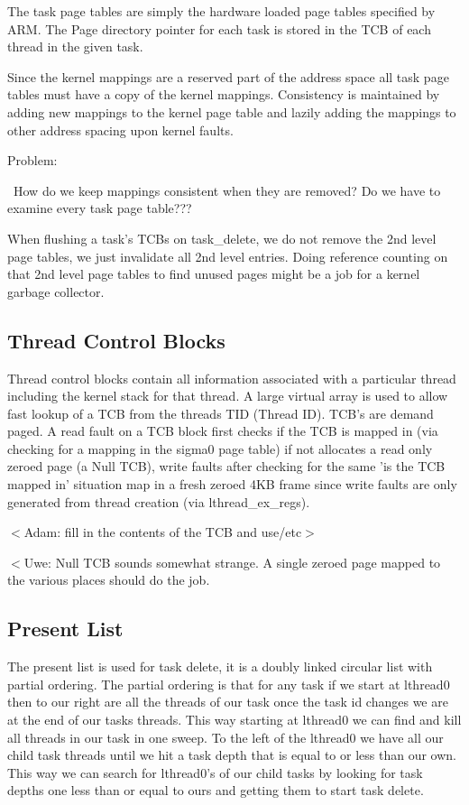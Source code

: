 \documentclass[a4paper,10pt,twoside]{article}
\newcommand{\Problem}{\begin{bf}Problem:\end{bf}\ }
\begin{document}
The task page tables are simply the hardware loaded page tables specified by ARM. The Page directory pointer for each task is stored in the TCB of each thread in the given task.

Since the kernel mappings are a reserved part of the address space all task page tables must have a copy of the kernel mappings. Consistency is maintained by adding new mappings to the kernel page table and lazily adding the mappings to other address spacing upon kernel faults.

\Problem How do we keep mappings consistent when they are removed? Do we have to examine every task page table???

When flushing a task's TCBs on task\_delete, we do not remove the 2nd level page tables, we just invalidate all 2nd level entries. Doing reference counting on that 2nd level page tables to find unused pages might be a job for a kernel garbage collector.

\subsection{Thread Control Blocks}

Thread control blocks contain all information associated with a particular thread including the kernel stack for that thread. A large virtual array is used to allow fast lookup of a TCB from the threads TID (Thread ID). TCB's are demand paged. A read fault on a TCB block first checks if the TCB is mapped in (via checking for a mapping in the sigma0 page table) if not allocates a read only zeroed page (a Null TCB), write faults after checking for the same 'is the TCB mapped in' situation map in a fresh zeroed 4KB frame since write faults are only generated from thread creation (via lthread\_ex\_regs).

$<$Adam: fill in the contents of the TCB and use/etc$>$

$<$Uwe: Null TCB sounds somewhat strange. A single zeroed page mapped to the various places should do the job.


\subsection{Present List}

The present list is used for task delete, it is a doubly linked circular list with partial ordering. The partial ordering is that for any task if we start at lthread0 then to our right are all the threads of our task once the task id changes we are at the end of our tasks threads. This way starting at lthread0 we can find and kill all threads in our task in one sweep. To the left of the lthread0 we have all our child task threads until we hit a task depth that is equal to or less than our own. This way we can search for lthread0's of our child tasks by looking for task depths one less than or equal to ours and getting them to start task delete.
\end{document}
